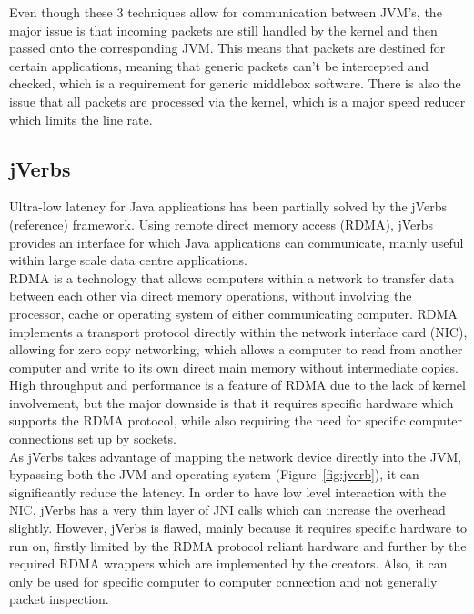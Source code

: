 \documentclass[a4paper, titlepage]{article}
\begin{document}
Even though these 3 techniques allow for communication between JVM's, the major issue is that incoming packets are still handled by the kernel and then passed onto the corresponding JVM. This means that packets are destined for certain applications, meaning that generic packets can't be intercepted and checked, which is a requirement for generic middlebox software. There is also the issue that all packets are processed via the kernel, which is a major speed reducer which limits the line rate.

\subsection{jVerbs}
Ultra-low latency for Java applications has been partially solved by the jVerbs (reference) framework. Using remote direct memory access (RDMA), jVerbs provides an interface for which Java applications can communicate, mainly useful within large scale data centre applications. \\
\newline
RDMA is a technology that allows computers within a network to transfer data between each other via direct memory operations, without involving the processor, cache or operating system of either communicating computer. RDMA implements a transport protocol directly within the network interface card (NIC), allowing for zero copy networking, which allows a computer to read from another computer and write to its own direct main memory without intermediate copies. High throughput and performance is a feature of RDMA due to the lack of kernel involvement, but the major downside is that it requires specific hardware which supports the RDMA protocol, while also requiring the need for specific computer connections set up by sockets. \\
\newline
As jVerbs takes advantage of mapping the network device directly into the JVM, bypassing both the JVM and operating system (Figure~\ref{fig:jverb}), it can significantly reduce the latency. In order to have low level interaction with the NIC, jVerbs has a very thin layer of JNI calls which can increase the overhead slightly. However, jVerbs is flawed, mainly because it requires specific hardware to run on, firstly limited by the RDMA protocol reliant hardware and further by the required RDMA wrappers which are implemented by the creators. Also, it can only be used for specific computer to computer connection and not generally packet inspection. 
\end{document}
